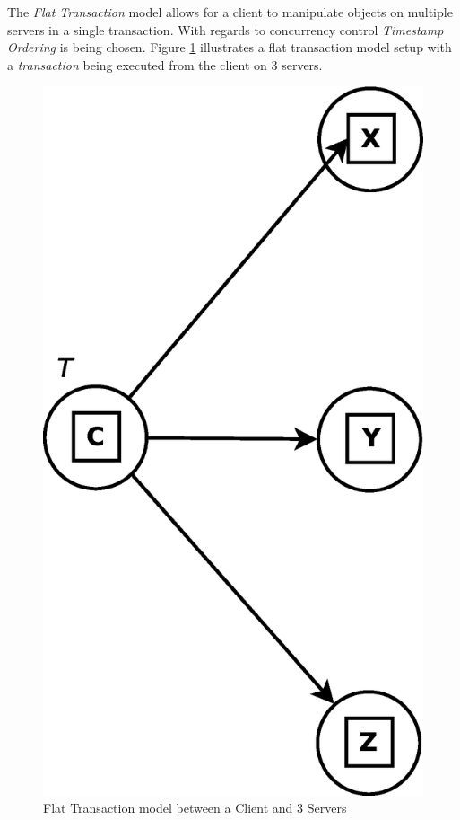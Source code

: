 \documentclass[times, 10pt,twocolumn]{article}
\begin{document}
\label{subsec:transmgt}
The {\it Flat Transaction} model allows for a client to manipulate objects on multiple servers in a single transaction. With regards to concurrency control {\it Timestamp Ordering} is being chosen. Figure \ref{fig:flat} illustrates a flat transaction model setup with a {\it transaction} being executed from the client on 3 servers.

\begin{figure}
\centering
\includegraphics[scale=0.2]{flat-transaction.eps}
\caption{Flat Transaction model between a Client and 3 Servers}
\label{fig:flat}
\end{figure}
\end{document}
